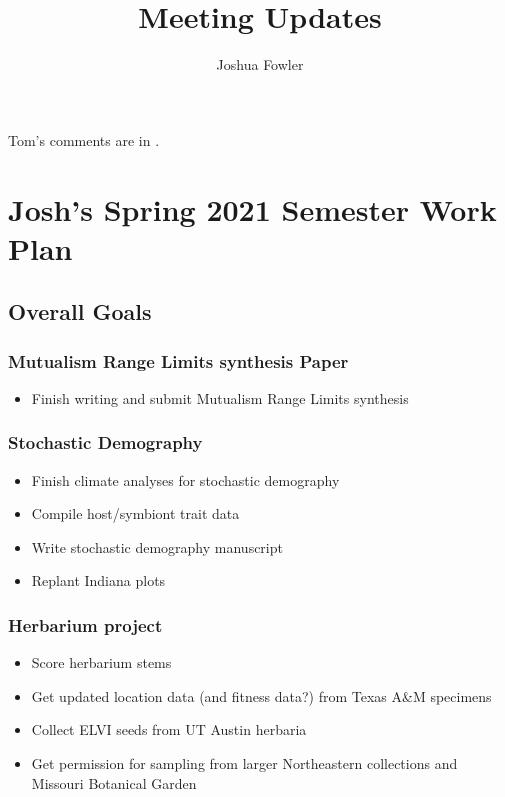 \documentclass{article}
\title{Meeting Updates}
\author{Joshua Fowler}
\newcommand{\tom}[1]{{\textit{\color{WildStrawberry}{[#1]}}}}
\begin{document}
%
  \maketitle
  Tom's comments are in \tom{WildStrawberry}.

\section*{Josh's Spring 2021 Semester Work Plan}
\subsection*{Overall Goals}
\subsubsection*{Mutualism Range Limits synthesis Paper}
\begin{itemize}
\item{Finish writing and submit Mutualism Range Limits synthesis}
\end{itemize}

\subsubsection*{Stochastic Demography}
\begin{itemize}
\item{Finish climate analyses for stochastic demography}
\item{Compile host/symbiont trait data}
\item{Write stochastic demography manuscript}
\item{Replant Indiana plots}
\end{itemize}

\subsubsection*{Herbarium project}
\begin{itemize}
\item{Score herbarium stems}
\item{Get updated location data (and fitness data?) from Texas A\&M specimens}
\item{Collect ELVI seeds from UT Austin herbaria}
\item{Get permission for sampling from larger Northeastern collections and Missouri Botanical Garden}
\end{itemize}
\end{document}
